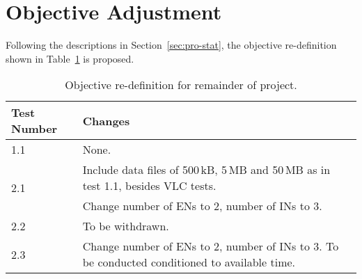 \section{Objective Adjustment}
\label{sec:obj-adj}

Following the descriptions in Section~\ref{sec:pro-stat}, the objective 
re-definition shown in Table~\ref{tab:re-def} is proposed.

\begin{table}[h!]
    \centering
    \footnotesize
        \begin{tabularx}{0.85\textwidth}{l X}
            \toprule
            \textbf{Test Number}    & \textbf{Changes} \\ [0.5ex]
            \midrule
            1.1                     & None. \\ [0.5ex]
            \midrule
            \multirow{2}{*}{2.1}    & Include data files of 500\,kB, 5\,MB and 50\,MB as in test 1.1, besides VLC tests.    \\ [0.5ex]
                                    & Change number of ENs to 2, number of INs to 3.                                        \\ [0.5ex]
            \midrule
            2.2                     & To be withdrawn. \\ [0.5ex]
            \midrule
            2.3                     & Change number of ENs to 2, number of INs to 3. To be conducted conditioned to available time. \\ [0.5ex]
            \bottomrule
        \end{tabularx}
    \caption{Objective re-definition for remainder of project.}
    \label{tab:re-def}
\end{table}
